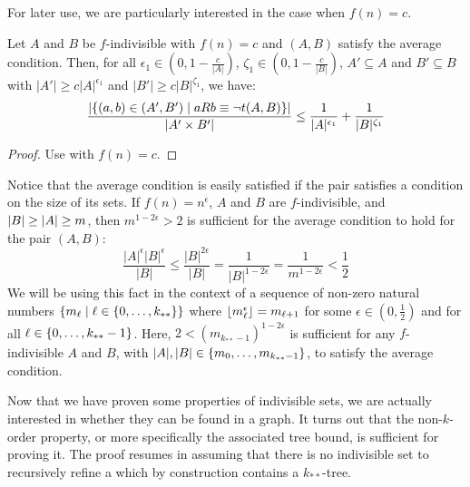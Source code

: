     For later use, we are particularly interested in the case when $f(n) = c$.

    \begin{corollary}[Corollary 4.9]
        Let $A$ and $B$ be $f$-indivisible with $f(n) = c$ and $(A,B)$ satisfy the average condition.
        Then, for all $\epsilon_1 \in (0, 1 - \frac{c}{|A|})$, $\zeta_1 \in (0, 1 - \frac{c}{|B|})$, $A' \subseteq A$ and
            $B' \subseteq B$ with $|A'| \geq c |A|^{\epsilon_1}$ and $|B'| \geq c |B|^{\zeta_1}$, we have:
        \[
            \frac{|\{ (a,b) \in (A',B') \mid a R b \equiv \neg t(A,B) \}|}{|A' \times B'|} \leq
                \frac{1}{|A|^{\epsilon_1}} + \frac{1}{|B|^{\zeta_1}}
        \]
        \begin{proof}
            Use  with $f(n) = c$.
        \end{proof}
    \end{corollary}

    \begin{remark}\label{rmk:sufficient_requirement_for_average_condition}
        Notice that the average condition is easily satisfied if the pair satisfies a condition on the size of its sets.
        If $f(n) = n^\epsilon$, $A$ and $B$ are $f$-indivisible, and $| B | \geq | A | \geq m$,
        then $m^{1-2\epsilon} > 2$ is sufficient for the average condition to hold for the pair $(A,B)$:
        \[
            \frac{|A|^\epsilon |B|^\epsilon}{|B|}
                \leq \frac{|B|^{2\epsilon}}{|B|}
                = \frac{1}{|B|^{1-2\epsilon}}
                = \frac{1}{m^{1-2\epsilon}}
                < \frac{1}{2}
        \]
        We will be using this fact in the context of a sequence of non-zero natural numbers
        $\{ m_\ell \mid \ell \in \{ 0, \dots, k_{**} \} \}$ where $\left\lfloor m_\ell^\epsilon \right\rfloor = m_{\ell+1}$
        for some $\epsilon \in (0, \frac{1}{2})$ and for all $\ell \in \{ 0, \dots, k_{**}-1 \}$.
        Here, $2 < (m_{k_{**}-1})^{1-2\epsilon}$ is sufficient for any $f$-indivisible $A$ and $B$, with
        $|A|, |B| \in \{ m_0, \dots, m_{k_{**}-1} \}$, to satisfy the average condition.
    \end{remark}

    Now that we have proven some properties of indivisible sets, we are actually interested in whether they can be
    found in a graph.
    It turns out that the non-$k$-order property, or more specifically the associated tree bound, is sufficient for
    proving it.
    The proof resumes in assuming that there is no indivisible set to recursively refine a 
    which by construction contains a $k_{**}$-tree.

